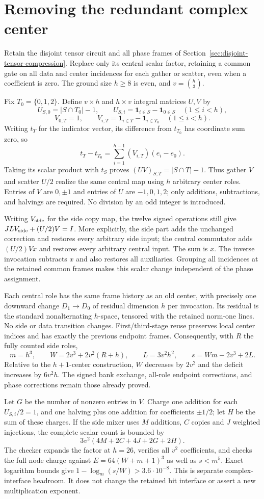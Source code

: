 \section{Removing the redundant complex center}
\label{sec:dyadic-central-factor}
Retain the disjoint tensor circuit and all phase frames of
Section~\ref{sec:disjoint-tensor-compression}. Replace only its central scalar
factor, retaining a common gate on all data and center incidences for each
gather or scatter, even when a coefficient is zero. The ground size $h\ge8$
is even, and $v=\binom h3$.

Fix $T_0=\{0,1,2\}$. Define $v\times h$ and $h\times v$ integral matrices
$U,V$ by
\[
 U_{S,0}=|S\cap T_0|-1,\qquad
 U_{S,i}=\mathbf1_{i\in S}-\mathbf1_{0\in S}\quad(1\le i<h),
\]
\[
 V_{0,T}=1,\qquad
 V_{i,T}=\mathbf1_{i\in T}-\mathbf1_{i\in T_0}\quad(1\le i<h).
\]
Writing $t_T$ for the indicator vector, its difference from $t_{T_0}$
has coordinate sum zero, so
\[
 t_T-t_{T_0}=\sum_{i=1}^{h-1}(V_{i,T})(e_i-e_0).
\]
Taking its scalar product with $t_S$ proves
$(UV)_{S,T}=|S\cap T|-1$. Thus gather $V$ and scatter $U/2$ realize
the same central map using $h$ arbitrary center roles. Entries of $V$ are
$0,\pm1$ and entries of $U$ are $-1,0,1,2$; only additions, subtractions,
and halvings are required. No division by an odd integer is introduced.

Writing $V_{\rm side}$ for the side copy map, the twelve signed operations
still give $JLV_{\rm side}+(U/2)V=I$. More explicitly, the side part
adds the unchanged correction and restores every arbitrary side input;
the central commutator adds $(U/2)Vx$ and restores every arbitrary central
input. The sum is $x$. The inverse invocation subtracts $x$ and also restores
all auxiliaries. Grouping all incidences at the retained common frames
makes this scalar change independent of the phase assignment.

Each central role has the same frame history as an old center, with precisely
one downward change $D_1\to D_0$ of residual dimension $h$ per invocation.
Its residual is the standard nonalternating $h$-space, tensored with the
retained norm-one lines. No side or data transition changes. First/third-stage
reuse preserves local center indices and has exactly the previous endpoint
frames. Consequently, with $R$ the fully counted side roles,
\[
 m=h^3,\qquad W=2v^3+2v^2(R+h),\qquad L=3v^2h^2,
 \qquad s=Wm-2v^3+2L.
\]
Relative to the $h+1$-center construction, $W$ decreases by $2v^2$ and
the deficit increases by $6v^2h$. The signed bank exchange, all-role endpoint
corrections, and phase corrections remain those already proved.

Let $G$ be the number of nonzero entries in $V$. Charge one addition for
each $U_{S,i}/2=1$, and one halving plus one addition for coefficients
$\pm1/2$; let $H$ be the sum of these charges. If the side mixer uses $M$
additions, $C$ copies and $J$ weighted injections, the complete scalar count
is bounded by
\[
 3v^2(4M+2C+4J+2G+2H).
\]
The checker expands the factor at $h=26$, verifies all $v^2$ coefficients,
and checks the full node charge against $E=64(W+m+1)^3$ as well as $s<m^5$.
Exact logarithm bounds give $1-\log_m(s/W)>3.6\cdot10^{-8}$.
This is separate complex-interface headroom. It does not change the retained
bit interface or assert a new multiplication exponent.
